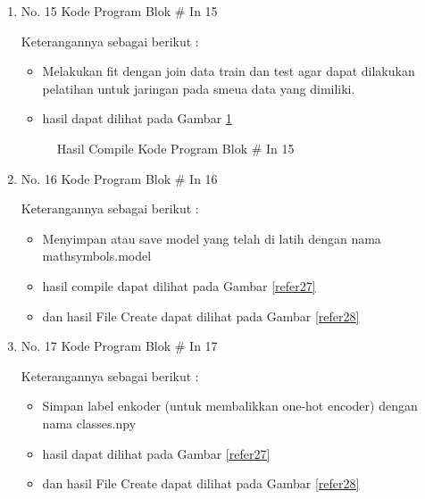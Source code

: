 \begin{enumerate}
\item No. 15 Kode Program Blok \# In 15
\par 
Keterangannya sebagai berikut :
\begin{itemize}
\item Melakukan fit dengan join data train dan test agar dapat dilakukan pelatihan untuk jaringan pada smeua data yang dimiliki.
\item hasil dapat dilihat pada Gambar \ref{refer26}
\end{itemize}

\begin{figure}[!htbp]
      \caption{Hasil Compile Kode Program Blok \# In 15}
      \label{refer26}
\end{figure}

\item No. 16 Kode Program Blok \# In 16
\par 
Keterangannya sebagai berikut :
\begin{itemize}
\item Menyimpan atau save model yang telah di latih dengan nama mathsymbols.model
\item hasil compile dapat dilihat pada Gambar \ref{refer27}
\item dan hasil File Create dapat dilihat pada Gambar \ref{refer28}
\end{itemize}

\item No. 17 Kode Program Blok \# In 17
\par 
Keterangannya sebagai berikut :
\begin{itemize}
\item Simpan label enkoder (untuk membalikkan one-hot encoder) dengan nama classes.npy
\item hasil dapat dilihat pada Gambar \ref{refer27}
\item dan hasil File Create dapat dilihat pada Gambar \ref{refer28}
\end{itemize}


\end{enumerate}
